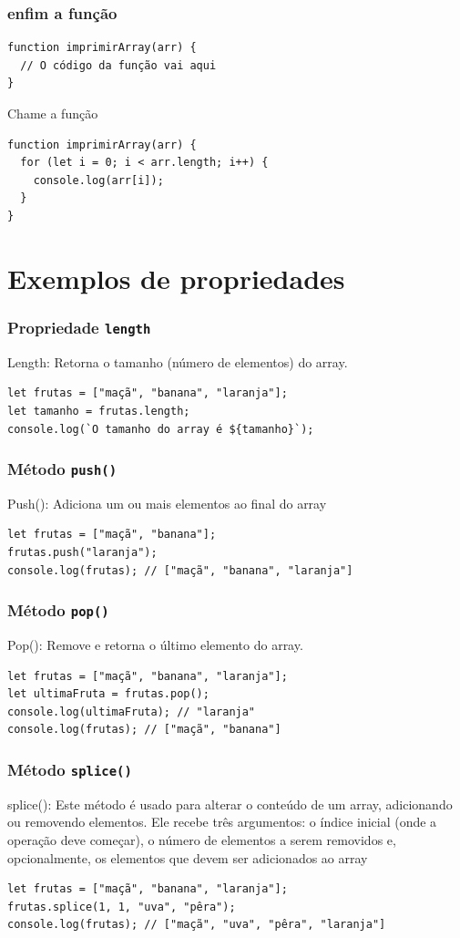 \documentclass[13pt, xcolor={dvipsnames,svgnames}, portuguese]{beamer}
\begin{document}
\begin{frame}[fragile]
\frametitle{enfim a função}
\begin{verbatim}
function imprimirArray(arr) {
  // O código da função vai aqui
}
\end{verbatim}
Chame a função
\begin{verbatim}
function imprimirArray(arr) {
  for (let i = 0; i < arr.length; i++) {
    console.log(arr[i]);
  }
}

\end{verbatim}

\end{frame}
\section{Exemplos de propriedades}
\begin{frame}[fragile]
\frametitle{Propriedade \texttt{length}}
Length: Retorna o tamanho (número de elementos) do array.
\begin{verbatim}
let frutas = ["maçã", "banana", "laranja"];
let tamanho = frutas.length;
console.log(`O tamanho do array é ${tamanho}`);
\end{verbatim}
\end{frame}


\begin{frame}[fragile]
\frametitle{Método \texttt{push()}}
Push(): Adiciona um ou mais elementos ao final do array
\begin{verbatim}
let frutas = ["maçã", "banana"];
frutas.push("laranja");
console.log(frutas); // ["maçã", "banana", "laranja"]
\end{verbatim}
\end{frame}



\begin{frame}[fragile]
\frametitle{Método \texttt{pop()}}
Pop(): Remove e retorna o último elemento do array.
\begin{verbatim}
let frutas = ["maçã", "banana", "laranja"];
let ultimaFruta = frutas.pop();
console.log(ultimaFruta); // "laranja"
console.log(frutas); // ["maçã", "banana"]
\end{verbatim}
\end{frame}


\begin{frame}[fragile]
\frametitle{Método \texttt{splice()}}
splice(): Este método é usado para alterar o conteúdo de um array, adicionando ou removendo elementos. Ele recebe três argumentos: o índice inicial (onde a operação deve começar), o número de elementos a serem removidos e, opcionalmente, os elementos que devem ser adicionados ao array
\begin{verbatim}
let frutas = ["maçã", "banana", "laranja"];
frutas.splice(1, 1, "uva", "pêra");
console.log(frutas); // ["maçã", "uva", "pêra", "laranja"]
\end{verbatim}
\end{frame}
\end{document}
